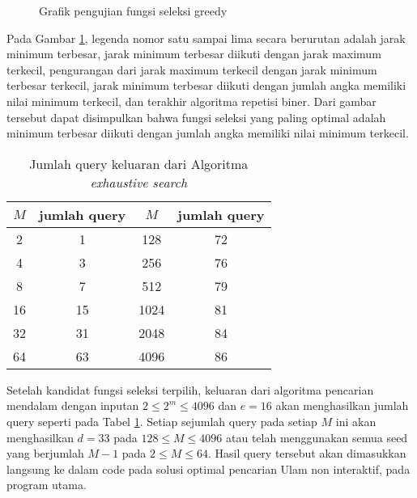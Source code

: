 \begin{figure}
\centering
{}
\caption{Grafik pengujian fungsi seleksi greedy}
\label{fig:graph_selection_function}
\end{figure}

Pada Gambar \ref{fig:graph_selection_function}, legenda nomor satu sampai lima secara berurutan adalah jarak minimum terbesar, jarak minimum terbesar diikuti dengan jarak maximum terkecil, pengurangan dari jarak maximum terkecil dengan jarak minimum terbesar terkecil, jarak minimum terbesar diikuti dengan jumlah angka memiliki nilai minimum terkecil, dan terakhir algoritma repetisi biner. Dari gambar tersebut dapat disimpulkan bahwa fungsi seleksi yang paling optimal adalah minimum terbesar diikuti dengan jumlah angka memiliki nilai minimum terkecil.

\begin{table}[h!]
\caption{Jumlah query keluaran dari Algoritma \textit{exhaustive search}}
\label{tab:query_count}
\begin{center}
\begin{tabular}{|c|c|c|c|}
\hline
$M$ & jumlah query & $M$ & jumlah query \\
\hline
2 & 1 & 128 & 72 \\
\hline
4 & 3 & 256 & 76 \\
\hline
8 & 7 & 512 & 79 \\
\hline
16 & 15 & 1024 & 81 \\
\hline
32 & 31 & 2048 & 84 \\
\hline
64 & 63 & 4096 & 86 \\
\hline
\end{tabular}
\end{center}
\end{table}

Setelah kandidat fungsi seleksi terpilih, keluaran dari algoritma pencarian mendalam dengan inputan $2 \leq 2^m \leq 4096$ dan $e=16$ akan menghasilkan jumlah query seperti pada Tabel \ref{tab:query_count}. Setiap sejumlah query pada setiap $M$ ini akan menghasilkan $d = 33$ pada $128 \leq M \leq 4096$ atau telah menggunakan semua seed yang berjumlah $M-1$ pada $2 \leq M \leq 64$. Hasil query tersebut akan dimasukkan langsung ke dalam code pada solusi optimal pencarian Ulam non interaktif, pada program utama.

